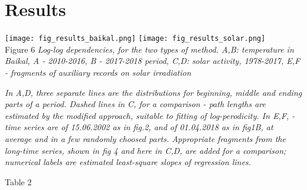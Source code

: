\documentclass[a4paper]{article}
\begin{document}
\section*{Results}

\texttt{[image: fig\_results\_baikal.png]}
\texttt{[image: fig\_results\_solar.png]}\\
Figure 6 \textit{Log-log dependencies, for the two types of method. A,B: temperature in Baikal, A - 2010-2016, B - 2017-2018 period, C,D: solar activity, 1978-2017, E,F - fragments of auxiliary records on solar irradiation}

\textit{\small{In A,D, three separate lines are the distributions for beginning, middle and ending parts of a period. Dashed lines in C, for a comparison - path lengths are estimated by the modified approach,  suitable to fitting of log-perodicity. In E,F, - time series are of 15.06.2002 as in fig.2, and of 01.04.2018 as in fig1B, at average and in a few randomly choosed parts. Appropriate fragments from the long-time series, shown in fig 4 and here in C,D, are added for a comparison; numerical labels are estimated least-square slopes of regression lines.}}

\newpage

Table 2 \textit{}
\end{document}
